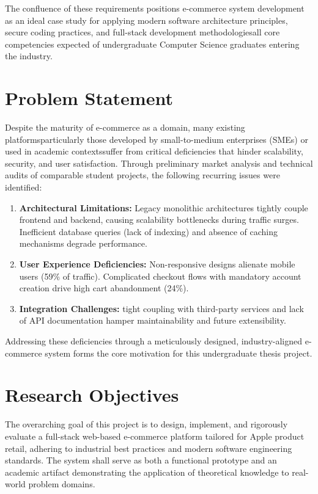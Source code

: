 \documentclass[12pt, a4paper]{report}
\begin{document}
The confluence of these requirements positions e-commerce system development as an ideal case study for applying modern software architecture principles, secure coding practices, and full-stack development methodologiesall core competencies expected of undergraduate Computer Science graduates entering the industry.

\section{Problem Statement}

Despite the maturity of e-commerce as a domain, many existing platformsparticularly those developed by small-to-medium enterprises (SMEs) or used in academic contextssuffer from critical deficiencies that hinder scalability, security, and user satisfaction. Through preliminary market analysis and technical audits of comparable student projects, the following recurring issues were identified:

\begin{enumerate}
    \item \textbf{Architectural Limitations:} Legacy monolithic architectures tightly couple frontend and backend, causing scalability bottlenecks during traffic surges. Inefficient database queries (lack of indexing) and absence of caching mechanisms degrade performance.
    
    \item \textbf{User Experience Deficiencies:} Non-responsive designs alienate mobile users (59\% of traffic). Complicated checkout flows with mandatory account creation drive high cart abandonment (24\%).
    
    \item \textbf{Integration Challenges:} tight coupling with third-party services and lack of API documentation hamper maintainability and future extensibility.
\end{enumerate}

\vspace{0.5cm}
\noindent Addressing these deficiencies through a meticulously designed, industry-aligned e-commerce system forms the core motivation for this undergraduate thesis project.

\section{Research Objectives}

The overarching goal of this project is to design, implement, and rigorously evaluate a full-stack web-based e-commerce platform tailored for Apple product retail, adhering to industrial best practices and modern software engineering standards. The system shall serve as both a functional prototype and an academic artifact demonstrating the application of theoretical knowledge to real-world problem domains.
\end{document}
